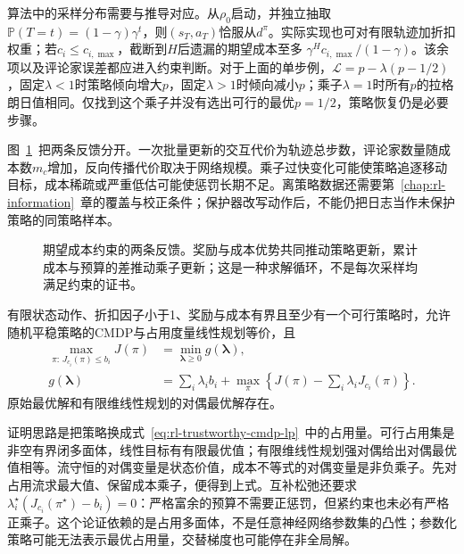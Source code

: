 算法中的采样分布需要与推导对应。从$\rho_0$启动，并独立抽取
$\mathbb P(T=t)=(1-\gamma)\gamma^t$，则$(s_T,a_T)$恰服从$d^\pi$。实际实现也可对有限轨迹加折扣权重；若$c_i\leq c_{i,\max}$，截断到$H$后遗漏的期望成本至多
$\gamma^Hc_{i,\max}/(1-\gamma)$。该余项以及评论家误差都应进入约束判断。对于上面的单步例，$\mathcal L=p-\lambda(p-1/2)$，固定$\lambda<1$时策略倾向增大$p$，固定$\lambda>1$时倾向减小$p$；乘子$\lambda=1$时所有$p$的拉格朗日值相同。仅找到这个乘子并没有选出可行的最优$p=1/2$，策略恢复仍是必要步骤。

图~\ref{fig:rl-trustworthy-primal-dual}~把两条反馈分开。一次批量更新的交互代价为轨迹总步数，评论家数量随成本数$m_c$增加，反向传播代价取决于网络规模。乘子过快变化可能使策略追逐移动目标，成本稀疏或严重低估可能使惩罚长期不足。离策略数据还需要第~\ref{chap:rl-information}~章的覆盖与校正条件；保护器改写动作后，不能仍把日志当作未保护策略的同策略样本。

\begin{figure}[htbp]
  \centering
  
  \caption{期望成本约束的两条反馈。奖励与成本优势共同推动策略更新，累计成本与预算的差推动乘子更新；这是一种求解循环，不是每次采样均满足约束的证书。}
  \label{fig:rl-trustworthy-primal-dual}
\end{figure}

\begin{theorem}[有限折扣CMDP的强对偶]
  \label{thm:rl-trustworthy-strong-duality}
  有限状态动作、折扣因子小于1、奖励与成本有界且至少有一个可行策略时，允许随机平稳策略的CMDP与占用度量线性规划等价，且
  \[
    \begin{aligned}
      \max_{\pi:\,J_{c_i}(\pi)\leq b_i}J(\pi)
        &=\min_{\bm{\lambda}\geq0}g(\bm{\lambda}),\\
      g(\bm{\lambda})
        &=\sum_i\lambda_i b_i+
          \max_\pi\left\{J(\pi)-\sum_i\lambda_iJ_{c_i}(\pi)\right\}.
    \end{aligned}
  \]
  原始最优解和有限维线性规划的对偶最优解存在。
\end{theorem}

证明思路是把策略换成式~\eqref{eq:rl-trustworthy-cmdp-lp}~中的占用量。可行占用集是非空有界闭多面体，线性目标有有限最优值；有限维线性规划强对偶给出对偶最优值相等。流守恒的对偶变量是状态价值，成本不等式的对偶变量是非负乘子。先对占用流求最大值、保留成本乘子，便得到上式。互补松弛还要求
$\lambda_i^\star(J_{c_i}(\pi^\star)-b_i)=0$：严格富余的预算不需要正惩罚，但紧约束也未必有严格正乘子。这个论证依赖的是占用多面体，不是任意神经网络参数集的凸性；参数化策略可能无法表示最优占用量，交替梯度也可能停在非全局解。

